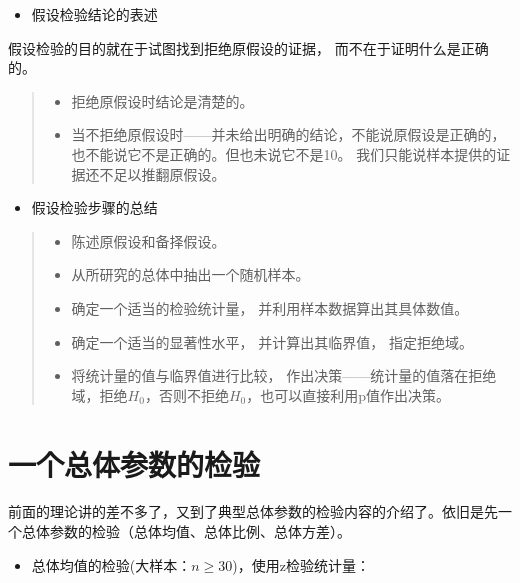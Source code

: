 \documentclass[]{ctexbook}
\providecommand{\tightlist}{%
  \setlength{\itemsep}{0pt}\setlength{\parskip}{0pt}}
\begin{document}
\begin{itemize}
\tightlist
\item
  假设检验结论的表述
\end{itemize}

假设检验的目的就在于试图找到拒绝原假设的证据， 而不在于证明什么是正确的。

\begin{quote}
\begin{itemize}
\tightlist
\item
  拒绝原假设时结论是清楚的。
\item
  当不拒绝原假设时------并未给出明确的结论，不能说原假设是正确的， 也不能说它不是正确的。但也未说它不是10。 我们只能说样本提供的证据还不足以推翻原假设。
\end{itemize}
\end{quote}

\begin{itemize}
\tightlist
\item
  假设检验步骤的总结
\end{itemize}

\begin{quote}
\begin{itemize}
\tightlist
\item
  陈述原假设和备择假设。
\item
  从所研究的总体中抽出一个随机样本。
\item
  确定一个适当的检验统计量， 并利用样本数据算出其具体数值。
\item
  确定一个适当的显著性水平， 并计算出其临界值， 指定拒绝域。
\item
  将统计量的值与临界值进行比较， 作出决策------统计量的值落在拒绝域，拒绝\(H_0\)，否则不拒绝\(H_0\)，也可以直接利用p值作出决策。
\end{itemize}
\end{quote}

\hypertarget{ux4e00ux4e2aux603bux4f53ux53c2ux6570ux7684ux68c0ux9a8c}{%
\section{一个总体参数的检验}\label{ux4e00ux4e2aux603bux4f53ux53c2ux6570ux7684ux68c0ux9a8c}}

前面的理论讲的差不多了，又到了典型总体参数的检验内容的介绍了。依旧是先一个总体参数的检验（总体均值、总体比例、总体方差）。

\begin{itemize}
\tightlist
\item
  总体均值的检验(大样本：\(n\geq30\))，使用z检验统计量：
\end{itemize}
\end{document}
